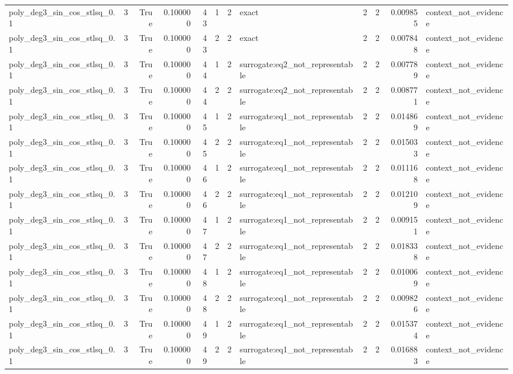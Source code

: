 \begin{tabular}{lrrrrrrlrrrl}
poly\_deg3\_sin\_cos\_stlsq\_0.1 & 3 & True & 0.100000 & 43 & 1 & 2 & exact & 2 & 2 & 0.009855 & context\_not\_evidence \\
poly\_deg3\_sin\_cos\_stlsq\_0.1 & 3 & True & 0.100000 & 43 & 2 & 2 & exact & 2 & 2 & 0.007848 & context\_not\_evidence \\
poly\_deg3\_sin\_cos\_stlsq\_0.1 & 3 & True & 0.100000 & 44 & 1 & 2 & surrogate:eq2\_not\_representable & 2 & 2 & 0.007789 & context\_not\_evidence \\
poly\_deg3\_sin\_cos\_stlsq\_0.1 & 3 & True & 0.100000 & 44 & 2 & 2 & surrogate:eq2\_not\_representable & 2 & 2 & 0.008771 & context\_not\_evidence \\
poly\_deg3\_sin\_cos\_stlsq\_0.1 & 3 & True & 0.100000 & 45 & 1 & 2 & surrogate:eq1\_not\_representable & 2 & 2 & 0.014869 & context\_not\_evidence \\
poly\_deg3\_sin\_cos\_stlsq\_0.1 & 3 & True & 0.100000 & 45 & 2 & 2 & surrogate:eq1\_not\_representable & 2 & 2 & 0.015033 & context\_not\_evidence \\
poly\_deg3\_sin\_cos\_stlsq\_0.1 & 3 & True & 0.100000 & 46 & 1 & 2 & surrogate:eq1\_not\_representable & 2 & 2 & 0.011168 & context\_not\_evidence \\
poly\_deg3\_sin\_cos\_stlsq\_0.1 & 3 & True & 0.100000 & 46 & 2 & 2 & surrogate:eq1\_not\_representable & 2 & 2 & 0.012109 & context\_not\_evidence \\
poly\_deg3\_sin\_cos\_stlsq\_0.1 & 3 & True & 0.100000 & 47 & 1 & 2 & surrogate:eq1\_not\_representable & 2 & 2 & 0.009151 & context\_not\_evidence \\
poly\_deg3\_sin\_cos\_stlsq\_0.1 & 3 & True & 0.100000 & 47 & 2 & 2 & surrogate:eq1\_not\_representable & 2 & 2 & 0.018338 & context\_not\_evidence \\
poly\_deg3\_sin\_cos\_stlsq\_0.1 & 3 & True & 0.100000 & 48 & 1 & 2 & surrogate:eq1\_not\_representable & 2 & 2 & 0.010069 & context\_not\_evidence \\
poly\_deg3\_sin\_cos\_stlsq\_0.1 & 3 & True & 0.100000 & 48 & 2 & 2 & surrogate:eq1\_not\_representable & 2 & 2 & 0.009826 & context\_not\_evidence \\
poly\_deg3\_sin\_cos\_stlsq\_0.1 & 3 & True & 0.100000 & 49 & 1 & 2 & surrogate:eq1\_not\_representable & 2 & 2 & 0.015374 & context\_not\_evidence \\
poly\_deg3\_sin\_cos\_stlsq\_0.1 & 3 & True & 0.100000 & 49 & 2 & 2 & surrogate:eq1\_not\_representable & 2 & 2 & 0.016883 & context\_not\_evidence \\

\end{tabular}
